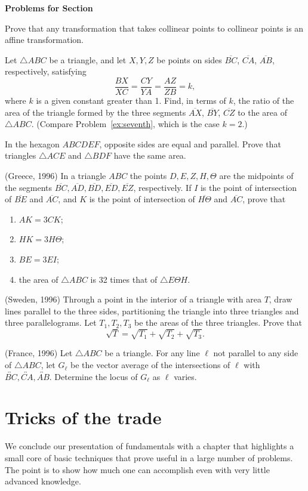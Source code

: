\documentclass[12pt]{book}
\newcounter{exc}
\numberwithin{exc}{section}
\numberwithin{figure}{section}
\newenvironment{exer}{\vspace{0.1in}
\noindent \textbf{Problems for Section~\thesection} \vspace{0.1in}
\begin{list}{\arabic{exc}.}{\usecounter{exc}}}{\end{list}}
\numberwithin{equation}{theorem}
\def\ii{\item}
\def\line#1{\overleftrightarrow{#1}}
\def\seg#1{\overline{#1}}
\begin{document}
\begin{exer}
\ii \label{ex:characterize affine}
Prove that any transformation that takes collinear points to collinear points is an affine transformation.
\ii \label{ex:seventh2}
Let $\triangle ABC$ be a triangle, and let $X,Y,Z$ be points on sides
$\seg{BC}$, $\seg{CA}$, $\seg{AB}$, respectively, satisfying
\[
\frac{BX}{XC} = \frac{CY}{YA} = \frac{AZ}{ZB} = k,
\]
where $k$ is a given constant greater than 1.
Find, in terms of $k$,
the ratio of the area of the triangle formed by the three segments
$\seg{AX}$, $\seg{BY}$, $\seg{CZ}$
to the area of $\triangle ABC$. (Compare Problem~\ref{ex:seventh}, which is the 
case $k= 2$.)
\ii \label{ex:samearea}
In the hexagon $ABCDEF$, opposite sides are equal and parallel. Prove that
triangles $\triangle ACE$ and $\triangle BDF$ have the same area.
 \ii
(Greece, 1996)
In a triangle $ABC$ the points $D, E, Z, H, \Theta$ are the midpoints 
of the segments $\seg{BC}, \seg{AD}, \seg{BD}, \seg{ED}, \seg{EZ}$, 
respectively. If $I$ is the 
point of intersection of $\seg{BE}$ and $\seg{AC}$, and $K$ is the point of 
intersection of $\seg{H\Theta}$ and $\seg{AC}$, prove that
\begin{enumerate}
\ii $AK = 3 CK$;
\ii $HK = 3 H\Theta$;
\ii $BE = 3 EI$;
\ii the area of $\triangle ABC$ is 32 times that of $\triangle E\Theta H$.
\end{enumerate}
\ii (Sweden, 1996)
Through a point in the interior of a triangle with area $T$, draw lines
parallel to the three sides, partitioning the triangle into three triangles
and three parallelograms. Let $T_1, T_2, T_3$ be the areas of the three
triangles. Prove that
\[
\sqrt T = \sqrt{T_1} + \sqrt{T_2} + \sqrt{T_3}.
\]
\ii (France, 1996)
Let $\triangle ABC$ be a triangle. For any line $\ell$ not parallel to any side 
of $\triangle ABC$, let $G_{\ell}$ be the vector average of the intersections
of $\ell$ with $\line{BC}, \line{CA}, 
\line{AB}$. Determine the 
locus of $G_{\ell}$ as $\ell$ varies.
\end{exer}


\chapter{Tricks of the trade}

We conclude our presentation of fundamentals with a chapter that highlights a small core of basic techniques 
that prove useful in a large number of problems. The point is to show 
how much one can accomplish even with very little advanced knowledge.
\end{document}
